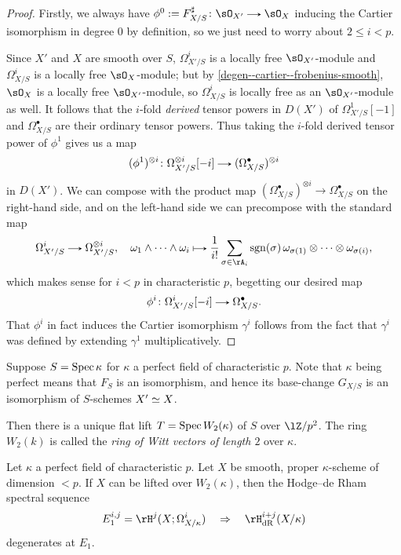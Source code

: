 \begin{proof}
  Firstly, we always have $\phi^0 \ce F_{X/S}^\sharp \c \sO_{X'} \to \sO_X$ inducing the Cartier isomorphism in degree $0$ by definition, so we just need to worry about $2 \le i < p$.

  Since $X'$ and $X$ are smooth over $S$, $\Omega_{X'/S}^i$ is a locally free $\sO_{X'}$-module and $\Omega_{X/S}^i$ is a locally free $\sO_X$-module; but by \cref{degen--cartier--frobenius-smooth}, $\sO_X$ is a locally free $\sO_{X'}$-module, so $\Omega_{X/S}^i$ is locally free as an $\sO_{X'}$-module as well. It follows that the $i$-fold \emph{derived} tensor powers in $D(X')$ of $\Omega_{X'/S}^1[-1]$ and $\Omega_{X/S}^\bullet$ are their ordinary tensor powers. Thus taking the $i$-fold derived tensor power of $\phi^1$ gives us a map
  \[
    (\phi^1)^{\otimes i} \c \Omega_{X'/S}^{\otimes i}[-i] \to (\Omega_{X/S}^\bullet)^{\otimes i}
  \]
  in $D(X')$. We can compose with the product map $(\Omega_{X/S}^\bullet)^{\otimes i} \to \Omega_{X/S}^\bullet$ on the right-hand side, and on the left-hand side we can precompose with the standard map
  \[
    \Omega_{X'/S}^i \to \Omega_{X'/S}^{\otimes i}, \quad
    \omega_1 \wedge \cdots \wedge \omega_i \mapsto \frac{1}{i!} \sum_{\sigma \in \rA_i} \operatorname{sgn}(\sigma)\, \omega_{\sigma(1)} \otimes \cdots \otimes \omega_{\sigma(i)},
  \]
  which makes sense for $i < p$ in characteristic $p$, begetting our desired map
  \[
    \phi^i \c \Omega_{X'/S}^i[-i] \to \Omega_{X/S}^\bullet.
  \]
  That $\phi^i$ in fact induces the Cartier isomorphism $\gamma^i$ follows from the fact that $\gamma^i$ was defined by extending $\gamma^1$ multiplicatively.
\end{proof}

\begin{definition}
  Suppose $S = \operatorname{Spec} \kappa$ for $\kappa$ a perfect field of characteristic $p$. Note that $\kappa$ being perfect means that $F_S$ is an isomorphism, and hence its base-change $G_{X/S}$ is an isomorphism of $S$-schemes $X' \simeq X$.

  Then there is a unique flat lift $T = \operatorname{Spec} W_2(\kappa)$ of $S$ over $\lZ/p^2$. The ring $W_2(k)$ is called the \emph{ring of Witt vectors of length $2$} over $\kappa$.
\end{definition}

\begin{theorem}
  \label{degen--lift--degen}
  Let $\kappa$ a perfect field of characteristic $p$. Let $X$ be smooth, proper $\kappa$-scheme of dimension $< p$. If $X$ can be lifted over $W_2(\kappa)$, then the Hodge--de Rham spectral sequence
  \[
    E_1^{i,j} = \rH^j(X;\Omega_{X/\kappa}^i) \quad \Rightarrow \quad
    \rH_\dR^{i+j}(X/\kappa)
  \]
  degenerates at $E_1$.
\end{theorem}

